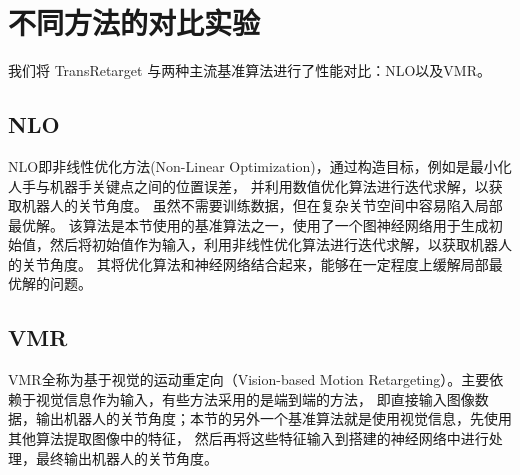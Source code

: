 \section{不同方法的对比实验}
我们将 TransRetarget 与两种主流基准算法进行了性能对比：NLO以及VMR。
\subsection{NLO}
NLO即非线性优化方法(Non-Linear Optimization)，通过构造目标，例如是最小化人手与机器手关键点之间的位置误差，
并利用数值优化算法进行迭代求解，以获取机器人的关节角度。
虽然不需要训练数据，但在复杂关节空间中容易陷入局部最优解。
该算法是本节使用的基准算法之一，使用了一个图神经网络用于生成初始值，然后将初始值作为输入，利用非线性优化算法进行迭代求解，以获取机器人的关节角度。
其将优化算法和神经网络结合起来，能够在一定程度上缓解局部最优解的问题。
\subsection{VMR}
VMR全称为基于视觉的运动重定向（Vision-based Motion Retargeting）。主要依赖于视觉信息作为输入，有些方法采用的是端到端的方法，
即直接输入图像数据，输出机器人的关节角度；本节的另外一个基准算法就是使用视觉信息，先使用其他算法提取图像中的特征，
然后再将这些特征输入到搭建的神经网络中进行处理，最终输出机器人的关节角度。
